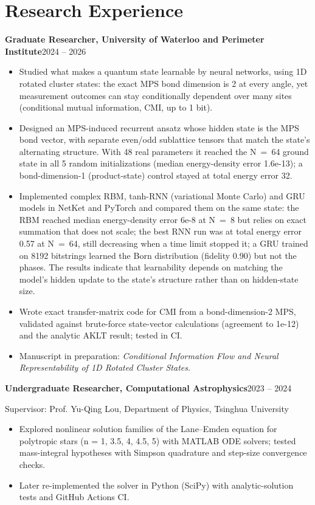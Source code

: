 \documentclass[11pt,letterpaper]{article}
\newcommand{\entry}[2]{\par\noindent\textbf{#1}\hfill #2\par}
\begin{document}
\section{Research Experience}
\entry{Graduate Researcher, University of Waterloo and Perimeter Institute}{2024 -- 2026}
\begin{itemize}
  \item Studied what makes a quantum state learnable by neural networks, using 1D rotated cluster states: the
        exact MPS bond dimension is 2 at every angle, yet measurement outcomes can stay conditionally dependent
        over many sites (conditional mutual information, CMI, up to 1 bit).
  \item Designed an MPS-induced recurrent ansatz whose hidden state is the MPS bond vector, with separate even/odd
        sublattice tensors that match the state's alternating structure. With 48 real parameters it reached the
        N~=~64 ground state in all 5 random initializations (median energy-density error 1.6e-13); a
        bond-dimension-1 (product-state) control stayed at total energy error 32.
  \item Implemented complex RBM, tanh-RNN (variational Monte Carlo) and GRU models in NetKet and PyTorch and
        compared them on the same state: the RBM reached median energy-density error 6e-8 at N~=~8 but relies
        on exact summation that does not scale; the best RNN run was at total energy error 0.57 at N~=~64, still
        decreasing when a time limit stopped it; a GRU trained on 8192 bitstrings learned the Born distribution
        (fidelity 0.90) but not the phases. The results indicate that learnability depends on matching the
        model's hidden update to the state's structure rather than on hidden-state size.
  \item Wrote exact transfer-matrix code for CMI from a bond-dimension-2 MPS, validated against brute-force
        state-vector calculations (agreement to 1e-12) and the analytic AKLT result; tested in CI.
  \item Manuscript in preparation: \textit{Conditional Information Flow and Neural Representability of 1D
        Rotated Cluster States}.
\end{itemize}

\entry{Undergraduate Researcher, Computational Astrophysics}{2023 -- 2024}
Supervisor: Prof. Yu-Qing Lou, Department of Physics, Tsinghua University
\begin{itemize}
  \item Explored nonlinear solution families of the Lane--Emden equation for polytropic stars
        (n = 1, 3.5, 4, 4.5, 5) with MATLAB ODE solvers; tested mass-integral hypotheses with Simpson
        quadrature and step-size convergence checks.
  \item Later re-implemented the solver in Python (SciPy) with analytic-solution tests and GitHub Actions CI.
\end{itemize}
\end{document}
